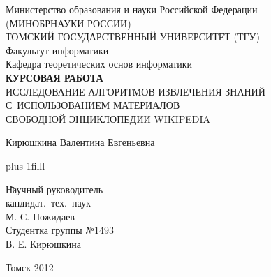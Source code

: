 
\thispagestyle{empty}
\vspace{4cm}
\begin{center}

Министерство образования и науки Российской Федерации\\
(МИНОБРНАУКИ РОССИИ)\\
ТОМСКИЙ ГОСУДАРСТВЕННЫЙ УНИВЕРСИТЕТ (ТГУ)\\
Факультут информатики\\
Кафедра теоретических основ информатики\\


\vspace{5cm}
\textbf{КУРСОВАЯ РАБОТА}\\

ИССЛЕДОВАНИЕ АЛГОРИТМОВ ИЗВЛЕЧЕНИЯ ЗНАНИЙ С~ИСПОЛЬЗОВАНИЕМ МАТЕРИАЛОВ \\
СВОБОДНОЙ ЭНЦИКЛОПЕДИИ WIKIPEDIA

Кирюшкина Валентина Евгеньевна

\end{center}

\vskip 0pt plus 1filll


\begin{tabbing}

\hspace{10cm} \= Научный руководитель\\
\> кандидат.~тех.~наук\\
\> М. С. Пожидаев\\
\> Студентка группы №1493\\
\> В. Е. Кирюшкина\\

\end{tabbing}


\vspace*{1cm}

\begin{center}
Томск 2012
\end{center}
